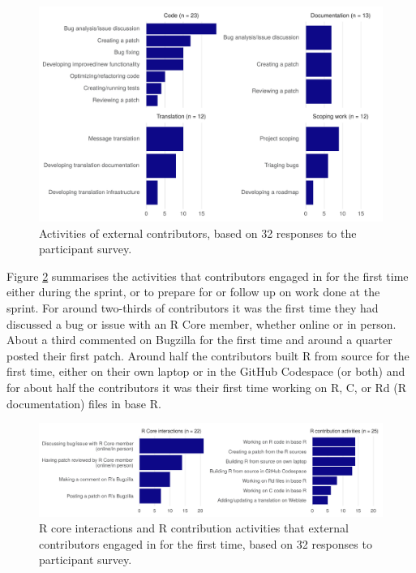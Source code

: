\begin{figure}
\includegraphics[width=1\linewidth]{figures/sprint_activities} \caption{Activities of external contributors, based on 32 responses to the participant survey.}\label{fig:activities}
\end{figure}

Figure \ref{fig:firsts} summarises the activities that contributors engaged in for the first time either during the sprint, or to prepare for or follow up on work done at the sprint. For around two-thirds of contributors it was the first time they had discussed a bug or issue with an R Core member, whether online or in person. About a third commented on Bugzilla for the first time and around a quarter posted their first patch. Around half the contributors built R from source for the first time, either on their own laptop or in the GitHub Codespace (or both) and for about half the contributors it was their first time working on R, C, or Rd (R documentation) files in base R.

\begin{figure}
\includegraphics[width=1\linewidth]{figures/first_activities} \caption{R core interactions and R contribution activities that external contributors engaged in for the first time, based on 32 responses to participant survey.}\label{fig:firsts}
\end{figure}

